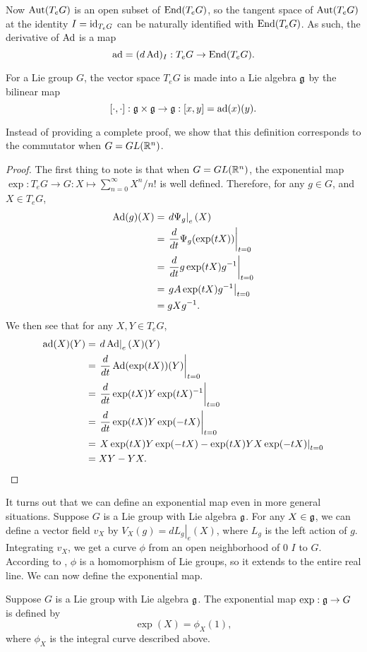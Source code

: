\documentclass[a4paper]{article}
\begin{document}
Now $\operatorname{Aut}(T_e G)$ is an open subset of $\operatorname{End}(T_e G)$, so the tangent space of $\operatorname{Aut}(T_e G)$ at the identity $I = \operatorname{id}_{T_e G}$ can be naturally identified with $\operatorname{End}(T_e G)$. As such, the derivative of $\operatorname{Ad}$ is a map
$$\operatorname{ad} = (d\operatorname{Ad})_{I}: T_e G \to \operatorname{End}(T_e G).$$

\begin{thm}
    For a Lie group $G$, the vector space $T_e G$ is made into a Lie algebra $\mathfrak{g}$ by the bilinear map
    $$\left[ \cdot, \cdot \right] : \mathfrak{g} \times \mathfrak{g} \to \mathfrak{g} : \left[ x, y \right] = \operatorname{ad}(x)(y).$$
\end{thm}

Instead of providing a complete proof, we show that this definition corresponds to the commutator when $G = GL(\mathbb{R}^n)$.

\begin{proof}
The first thing to note is that when $G = GL(\mathbb{R}^n)$, the exponential map $\exp: T_e G \to G: X \mapsto \sum_{n=0}^{\infty} X^n/n!$ is well defined. Therefore, for any $g \in G$, and $X \in T_e G$,
\begin{align*}
\operatorname{Ad}(g)(X) &= \left. d\Psi_g \right|_e (X)\\
    &= \left. \frac{d}{dt} \Psi_g(\exp(tX)) \right|_{t=0} \\
    &= \left. \frac{d}{dt} g\exp(tX)g^{-1} \right|_{t=0} \\
    &= \left. gA \exp(t X)g^{-1} \right|_{t=0}\\
    &= gXg^{-1}.
\end{align*}
We then see that for any $X, Y \in T_e G$,
\begin{align*}
\operatorname{ad}(X)(Y) &= \left. d\operatorname{Ad} \right|_e (X)(Y)\\
    &= \left. \frac{d}{dt} \operatorname{Ad}(\exp(tX))(Y)\right|_{t=0} \\
    &= \left. \frac{d}{dt} \exp(tX)Y\exp(tX)^{-1}\right|_{t=0} \\
    &= \left. \frac{d}{dt} \exp(tX)Y\exp(-tX)\right|_{t=0} \\
    &= \left. X\exp(tX)Y\exp(-tX) - \exp(tX)Y X \exp(-tX)\right|_{t=0} \\
    &= XY - Y X.
\end{align*}
\end{proof}

It turns out that we can define an exponential map even in more general situations. Suppose $G$ is a Lie group with Lie algebra $\mathfrak{g}$. For any $X \in \mathfrak{g}$, we can define a vector field $v_{X}$ by $V_X(g) = \left. dL_g \right|_e (X)$, where $L_g$ is the left action of $g$. Integrating $v_X$, we get a curve $\phi$ from an open neighborhood of 0 $I$ to $G$. According to \cite{fulton_harris}, $\phi$ is a homomorphism of Lie groups, so it extends to the entire real line. We can now define the exponential map.
\begin{defi}
    Suppose $G$ is a Lie group with Lie algebra $\mathfrak{g}$. The exponential map $\exp : \mathfrak{g} \to G$ is defined by 
    $$\exp(X) = \phi_X(1),$$
    where $\phi_X$ is the integral curve described above. 
\end{defi}
\end{document}

